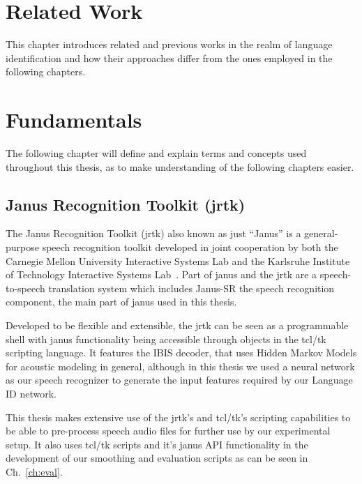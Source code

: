 
\chapter{Related Work}
\label{ch:Related Work}
This chapter introduces related and previous works in the realm of language identification and how their approaches differ from the ones employed in the following chapters.

\chapter{Fundamentals}
\label{ch:fund}

The following chapter will define and explain terms and concepts used throughout this thesis, as to make understanding of the following chapters easier.

\section{Janus Recognition Toolkit (jrtk)}
\label{sec:fund:jrtk}
The Janus Recognition Toolkit (jrtk) also known as just ``Janus'' is a general-purpose speech recognition toolkit developed in joint cooperation by both the Carnegie Mellon University Interactive Systems Lab and the Karlsruhe Institute of Technology Interactive Systems Lab~\cite{lavie1997janus}. Part of janus and the jrtk are a speech-to-speech translation system which includes Janus-SR the speech recognition component, the main part of janus used in this thesis. 

Developed to be flexible and extensible, the jrtk can be seen as a programmable shell with janus functionality being accessible through objects in the tcl/tk scripting language. It features the IBIS decoder, that uses Hidden Markov Models for acoustic modeling in general, although in this thesis we used a neural network as our speech recognizer to generate the input features required by our Language ID network.

This thesis makes extensive use of the jrtk's and tcl/tk's scripting capabilities to be able to pre-process speech audio files for further use by our experimental setup. It also uses tcl/tk scripts and it's janus API functionality in the development of our smoothing and evaluation scripts as can be seen in Ch.~\ref{ch:eval}.
